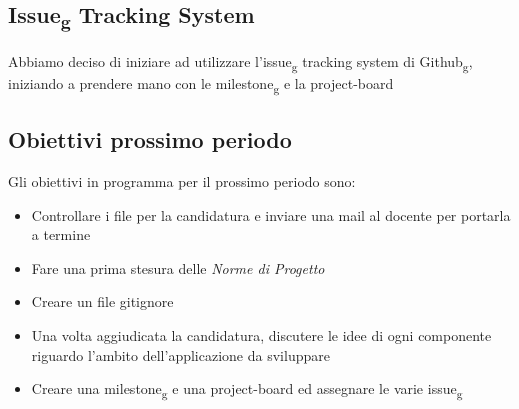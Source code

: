 \subsection{Issue\textsubscript{g} Tracking System}
Abbiamo deciso di iniziare ad utilizzare l'issue\textsubscript{g} tracking system di Github\textsubscript{g}, iniziando a prendere mano con le milestone\textsubscript{g} e la project-board

\subsection{Obiettivi prossimo periodo}
Gli obiettivi in programma per il prossimo periodo sono:
\begin{itemize}
\item Controllare i file per la candidatura e inviare una mail al docente per portarla a termine
\item Fare una prima stesura delle \textit{Norme di Progetto}
\item Creare un file gitignore
\item Una volta aggiudicata la candidatura, discutere le idee di ogni componente riguardo l'ambito dell'applicazione da sviluppare
\item Creare una milestone\textsubscript{g} e una project-board ed assegnare le varie issue\textsubscript{g}
\end{itemize}

